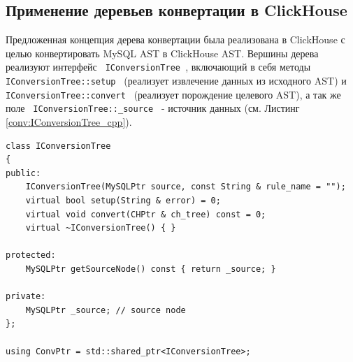 \subsection{Применение деревьев конвертации в ClickHouse}
Предложенная концепция дерева конвертации была реализована в ClickHouse с целью конвертировать MySQL AST в ClickHouse AST. Вершины дерева реализуют интерфейс \texttt{ IConversionTree }, включающий в себя методы \texttt{ IConversionTree::setup } (реализует извлечение данных из исходного AST) и \texttt{ IConversionTree::convert } (реализует порождение целевого AST), а так же поле \texttt{ IConversionTree::_source } - источник данных (см. Листинг \ref{conv:IConversionTree_cpp}).

\begin{code}
    \label{conv:IConversionTree_cpp}
    \begin{verbatim}
class IConversionTree
{
public:
    IConversionTree(MySQLPtr source, const String & rule_name = "");
    virtual bool setup(String & error) = 0;
    virtual void convert(CHPtr & ch_tree) const = 0;
    virtual ~IConversionTree() { }

protected:
    MySQLPtr getSourceNode() const { return _source; }

private:
    MySQLPtr _source; // source node
};

using ConvPtr = std::shared_ptr<IConversionTree>;
    \end{verbatim}
\end{code}

